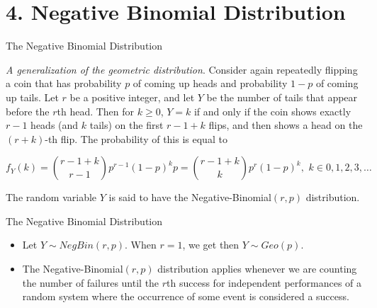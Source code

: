 \documentclass[12pt,ignorenonframetext,compress]{beamer}
\providecommand{\tightlist}{%
  \setlength{\itemsep}{0pt}\setlength{\parskip}{0pt}}
\begin{document}
\section{4. Negative Binomial
Distribution}\label{negative-binomial-distribution}

\begin{frame}{The Negative Binomial Distribution}

\emph{A generalization of the geometric distribution}. Consider again
repeatedly flipping a coin that has probability \(p\) of coming up heads
and probability \(1-p\) of coming up tails. Let \(r\) be a positive
integer, and let \(Y\) be the number of tails that appear before the
\(r\)th head. Then for \(k \geq 0\), \(Y=k\) if and only if the coin
shows exactly \(r-1\) heads (and \(k\) tails) on the first \(r-1+k\)
flips, and then shows a head on the \((r + k)\)-th flip. The probability
of this is equal to

\pause 

\[f_{Y}(k)=\binom{r-1+k}{r-1}p^{r-1}(1-p)^{k}p = \binom{r-1+k}{k}p^{r}(1-p)^{k}, \,\,k\in 0,1,2,3,\ldots \]

\pause

The random variable \(Y\) is said to have the
Negative-Binomial\((r, p)\) distribution.

\end{frame}

\begin{frame}{The Negative Binomial Distribution}

\begin{itemize}[<+->]
\tightlist
\item
  Let \(Y\sim NegBin(r,p)\). When \(r=1\), we get then
  \(Y \sim Geo(p)\).\\
\item
  The Negative-Binomial\((r,p)\) distribution applies whenever we are
  counting the number of failures until the \(r\)th success for
  independent performances of a random system where the occurrence of
  some event is considered a success.
\end{itemize}

\end{frame}
\end{document}

